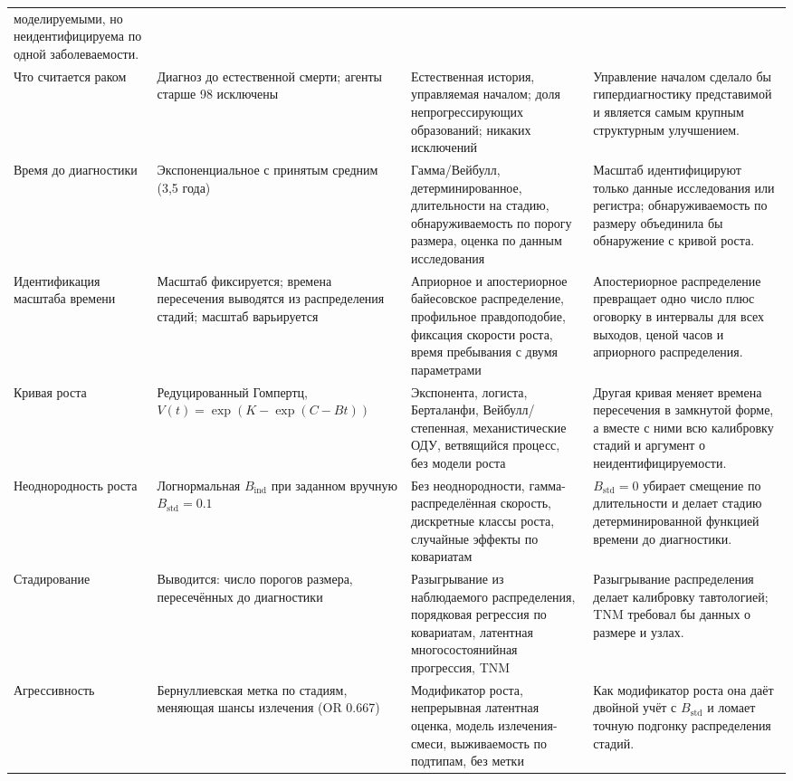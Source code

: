 \documentclass[12pt,a4paper]{article}
\begin{document}
{\begin{longtable}{@{}p{2.3cm}p{4.5cm}p{4.0cm}p{4.0cm}@{}}
моделируемыми, но неидентифицируема по одной заболеваемости. \\
Что считается раком & Диагноз до естественной смерти; агенты старше 98 исключены & Естественная история,
управляемая началом; доля непрогрессирующих образований; никаких исключений & Управление началом сделало бы
гипердиагностику представимой и является самым крупным структурным улучшением. \\
Время до диагностики & Экспоненциальное с принятым средним (3,5 года) & Гамма/Вейбулл, детерминированное,
длительности на стадию, обнаруживаемость по порогу размера, оценка по данным исследования & Масштаб
идентифицируют только данные исследования или регистра; обнаруживаемость по размеру объединила бы
обнаружение с кривой роста. \\
Идентификация масштаба времени & Масштаб фиксируется; времена пересечения выводятся из распределения
стадий; масштаб варьируется & Априорное и апостериорное байесовское распределение, профильное
правдоподобие, фиксация скорости роста, время пребывания с двумя параметрами & Апостериорное распределение
превращает одно число плюс оговорку в интервалы для всех выходов, ценой часов и априорного распределения. \\
Кривая роста & Редуцированный Гомпертц, $V(t)=\exp(K-\exp(C-Bt))$ & Экспонента, логиста, Берталанфи,
Вейбулл/степенная, механистические ОДУ, ветвящийся процесс, без модели роста & Другая кривая меняет времена
пересечения в замкнутой форме, а вместе с ними всю калибровку стадий и аргумент о неидентифицируемости. \\
Неоднородность роста & Логнормальная $B_{\text{ind}}$ при заданном вручную $B_{\text{std}}=0.1$ & Без
неоднородности, гамма-распределённая скорость, дискретные классы роста, случайные эффекты по ковариатам &
$B_{\text{std}}=0$ убирает смещение по длительности и делает стадию детерминированной функцией времени до
диагностики. \\
Стадирование & Выводится: число порогов размера, пересечённых до диагностики & Разыгрывание из наблюдаемого
распределения, порядковая регрессия по ковариатам, латентная многосостоянийная прогрессия, TNM & Разыгрывание
распределения делает калибровку тавтологией; TNM требовал бы данных о размере и узлах. \\
Агрессивность & Бернуллиевская метка по стадиям, меняющая шансы излечения (OR 0.667) & Модификатор роста,
непрерывная латентная оценка, модель излечения-смеси, выживаемость по подтипам, без метки & Как модификатор
роста она даёт двойной учёт с $B_{\text{std}}$ и ломает точную подгонку распределения стадий. \\

\end{longtable}}
\end{document}

